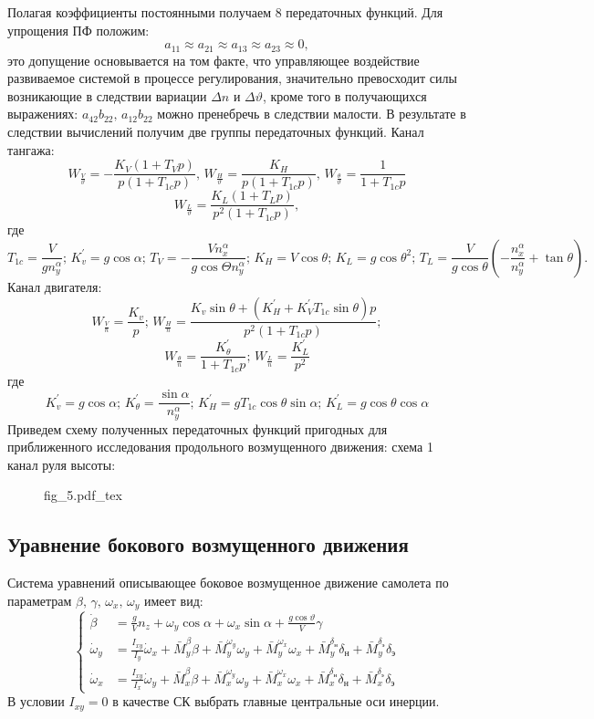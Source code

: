 \documentclass{article}
\begin{document}
Полагая коэффициенты постоянными получаем 8 передаточных функций. Для упрощения
ПФ положим:
\[
	a_{11} \approx a_{21} \approx a_{13} \approx a_{23} \approx 0,
\]
это допущение основывается на том факте, что управляющее воздействие
развиваемое системой в процессе регулирования, значительно превосходит силы
возникающие в следствии вариации $\Delta n$ и $\Delta \vartheta$, кроме того в
получающихся выражениях:
$a_{42} b_{22}, \, a_{12} b_{22}$ можно пренебречь в следствии малости.
В результате в следствии вычислений получим две группы передаточных функций.
Канал тангажа:
\[
	W_{\frac{V}{\vartheta}} = -\frac{K_V(1+T_Vp)}{p(1+T_{1c}p)}, \,
	W_{\frac{H}{\vartheta}} = \frac{K_H}{p(1+T_{1c}p)}, \,
	W_{\frac{\theta}{\vartheta}} = \frac{1}{1+T_{1c}p}
\]
\[
	W_{\frac{L}{\vartheta}} = \frac{K_L(1+T_Lp)}{p^2(1+T_{1c}p)},
\]
где
\[
	T_{1c} = \frac{V}{g n_y^\alpha}; \, K_v^{'} = g\cos{\alpha}; \, T_V =
	-\frac{V n_x^\alpha}{g \cos{\Theta} n_y^\alpha};\, K_H = V \cos{\theta}; \,
	K_L = g \cos{\theta}^2 ;\, T_L= \frac{V}{g \cos{\theta}} (-
	\frac{n_x^\alpha}{n_y^\alpha} + \tan{\theta}).
\]
Канал двигателя:
\[
	W_{\frac{V}{n}} = \frac{K_v}{p};\, W_{\frac{H}{n}} = \frac{K_v \sin{\theta}
	+ (K_H^{'} + K_V^{'} T_{1c} \sin{\theta})p}{p^2(1+T_{1c}p)};
\]
\[
	W_{\frac{\theta}{n}} = \frac{K_\theta^{'}}{1+T_{1c}p}; \, W_{\frac{L}{n}} =
	\frac{K_L^{'}}{p^2}
\]
где
\[
	K_v^{'} = g\cos{\alpha}; \, K_\theta^{'} = \frac{\sin{\alpha}}{n_y^\alpha};
	\, K_H^{'} = gT_{1c} \cos{\theta}\sin{\alpha};\, K_L^{'} = g\cos{\theta}
	\cos{\alpha}
\]
Приведем схему полученных передаточных функций пригодных для приближенного
исследования продольного возмущенного движения:
схема 1 канал руля высоты:
\begin{figure}[ht]
	{fig_5.pdf_tex}
\end{figure}

\subsection{Уравнение бокового возмущенного движения}

Система уравнений описывающее боковое возмущенное движение самолета по
параметрам $\beta, \, \gamma, \, \omega_x, \, \omega_y$ имеет вид:
\begin{equation}
	\begin{cases}
		\dot{\beta}    & = \frac{g}{V} n_z + \omega_y \cos{\alpha} + \omega_x
		\sin{\alpha} + \frac{g\cos{\vartheta}}{V} \gamma
		\\
		\dot{\omega}_y & = \frac{I_{xy}}{I_y} \dot{\omega}_x + \bar{M}_y^\beta
		\beta + \bar{M}_y^{\omega_y} \omega_y + \bar{M}_y^{\omega_x} \omega_x +
		\bar{M}_y^{\delta_\text{н}} \delta_\text{н} +
		\bar{M}_y^{\delta_\text{э}} \delta_\text{э}                            \\
		\dot{\omega}_x & = \frac{I_{xy}}{I_x} \dot{\omega}_y + \bar{M}_x^\beta
		\beta + \bar{M}_x^{\omega_y} \omega_y + \bar{M}_x^{\omega_x} \omega_x +
		\bar{M}_x^{\delta_\text{н}} \delta_\text{н} +
		\bar{M}_x^{\delta_\text{э}} \delta_\text{э}
	\end{cases}
\end{equation}
В условии $I_{xy} = 0$ в качестве СК выбрать главные центральные оси инерции.
\end{document}
